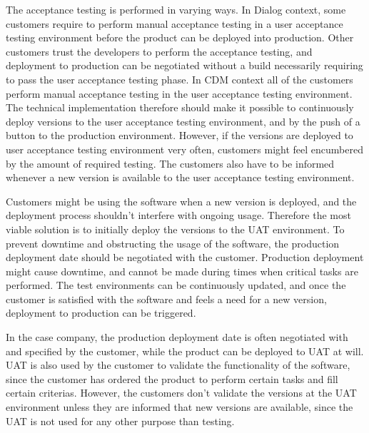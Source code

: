 \documentclass[english, grading]{tktltiki2}
\theoremstyle{definition}
\theoremstyle{remark}
\begin{document}
The acceptance testing is performed in varying ways. In Dialog context, some customers require to perform manual acceptance testing in a user acceptance testing environment before the product can be deployed into production. Other customers trust the developers to perform the acceptance testing, and deployment to production can be negotiated without a build necessarily requiring to pass the user acceptance testing phase. In CDM context all of the customers perform manual acceptance testing in the user acceptance testing environment. The technical implementation therefore should make it possible to continuously deploy versions to the user acceptance testing environment, and by the push of a button to the production environment. However, if the versions are deployed to user acceptance testing environment very often, customers might feel encumbered by the amount of required testing. The customers also have to be informed whenever a new version is available to the user acceptance testing environment.

Customers might be using the software when a new version is deployed, and the deployment process shouldn't interfere with ongoing usage. Therefore the most viable solution is to initially deploy the versions to the UAT environment. To prevent downtime and obstructing the usage of the software, the production deployment date should be negotiated with the customer. Production deployment might cause downtime, and cannot be made during times when critical tasks are performed. The test environments can be continuously updated, and once the customer is satisfied with the software and feels a need for a new version, deployment to production can be triggered.  

In the case company, the production deployment date is often negotiated with and specified by the customer, while the product can be deployed to UAT at will. UAT is also used by the customer to validate the functionality of the software, since the customer has ordered the product to perform certain tasks and fill certain criterias. However, the customers don't validate the versions at the UAT environment unless they are informed that new versions are available, since the UAT is not used for any other purpose than testing. 



\end{document}
